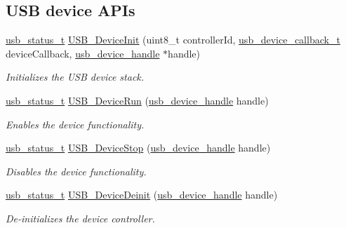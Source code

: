 \subsection*{U\-S\-B device A\-P\-Is}
\begin{DoxyCompactItemize}
\item 
\hyperlink{group__usb__drv_ga3172b9f50553fb6d8aa2823d10a39c58}{usb\-\_\-status\-\_\-t} \hyperlink{group__usb__device__driver_ga8fc2eafa1142f904576bbd697d785184}{U\-S\-B\-\_\-\-Device\-Init} (uint8\-\_\-t controller\-Id, \hyperlink{group__usb__device__driver_gac8ba48f1dea2c0b099092576ad48fb4e}{usb\-\_\-device\-\_\-callback\-\_\-t} device\-Callback, \hyperlink{group__usb__drv_gae62132dc6e5eba994f8aa56cb7399abc}{usb\-\_\-device\-\_\-handle} $\ast$handle)
\begin{DoxyCompactList}\small\item\em Initializes the U\-S\-B device stack. \end{DoxyCompactList}\item 
\hyperlink{group__usb__drv_ga3172b9f50553fb6d8aa2823d10a39c58}{usb\-\_\-status\-\_\-t} \hyperlink{group__usb__device__driver_gaecab79f44d7c16d5344aef538ddfa40e}{U\-S\-B\-\_\-\-Device\-Run} (\hyperlink{group__usb__drv_gae62132dc6e5eba994f8aa56cb7399abc}{usb\-\_\-device\-\_\-handle} handle)
\begin{DoxyCompactList}\small\item\em Enables the device functionality. \end{DoxyCompactList}\item 
\hyperlink{group__usb__drv_ga3172b9f50553fb6d8aa2823d10a39c58}{usb\-\_\-status\-\_\-t} \hyperlink{group__usb__device__driver_ga1000e1b314d75bc51e54953c78dd66f2}{U\-S\-B\-\_\-\-Device\-Stop} (\hyperlink{group__usb__drv_gae62132dc6e5eba994f8aa56cb7399abc}{usb\-\_\-device\-\_\-handle} handle)
\begin{DoxyCompactList}\small\item\em Disables the device functionality. \end{DoxyCompactList}\item 
\hyperlink{group__usb__drv_ga3172b9f50553fb6d8aa2823d10a39c58}{usb\-\_\-status\-\_\-t} \hyperlink{group__usb__device__driver_gafff2a5a6ac37dec01242225516a22024}{U\-S\-B\-\_\-\-Device\-Deinit} (\hyperlink{group__usb__drv_gae62132dc6e5eba994f8aa56cb7399abc}{usb\-\_\-device\-\_\-handle} handle)
\begin{DoxyCompactList}\small\item\em De-\/initializes the device controller. \end{DoxyCompactList}\item 

\end{DoxyCompactItemize}
